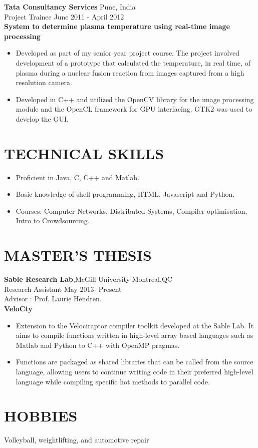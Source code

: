 \documentclass[11pt]{res} %
\begin{document}
\begin{resume}
\noindent \textbf{Tata Consultancy Services} \hfill \hfill Pune, India\\
\noindent Project Trainee \hfill \hfill June 2011 - April 2012 \\
\textbf{System to determine plasma temperature using real-time image processing}
\begin{itemize}
\item Developed as part of my senior year project course. The project involved development of a prototype that calculated the
temperature, in real time, of plasma during a nuclear fusion reaction from images captured from a high resolution camera.
\item Developed in C++ and utilized the OpenCV library for the image processing module and the OpenCL framework for GPU
interfacing. GTK2 was used to develop the GUI.
\end{itemize}

\section{TECHNICAL SKILLS} 
\begin{itemize} 
\item Proficient in Java, C, C++ and Matlab.
\item Basic knowledge of shell programming, HTML, Javascript and Python.
\item Courses: Computer Networks, Distributed Systems, Compiler optimisation, Intro to Crowdsourcing.
\end{itemize}
\section{MASTER'S THESIS} 
\noindent \textbf{Sable Research Lab},McGill University  \hfill \hfill Montreal,QC\\
\noindent Research Assistant \hfill \hfill May 2013- Present\\
Advisor : Prof. Laurie Hendren. \\
\textbf{VeloCty}
\begin{itemize}
\item Extension to the Velociraptor compiler toolkit developed at the Sable Lab. It aims to compile functions written in
high-level array based languages such as Matlab and Python to C++ with OpenMP pragmas. 
\item Functions are packaged as shared libraries that can be called from the source language, allowing users to continue
writing code in their preferred high-level language while compiling specific hot methods to parallel code.
\end{itemize}
\section{HOBBIES} 
 
Volleyball, weightlifting, and automotive repair 
 

\end{resume}
\end{document}
